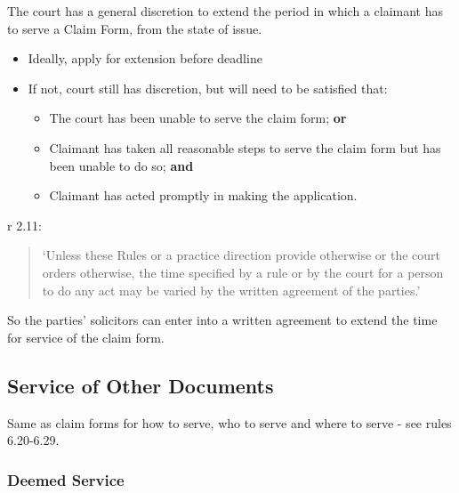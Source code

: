 \documentclass[
]{article}
\providecommand{\tightlist}{%
  \setlength{\itemsep}{0pt}\setlength{\parskip}{0pt}}
\begin{document}
The court has a general discretion to extend the period in which a
claimant has to serve a Claim Form, from the state of issue.

\begin{itemize}
\tightlist
\item
  Ideally, apply for extension before deadline
\item
  If not, court still has discretion, but will need to be satisfied
  that:

  \begin{itemize}
  \tightlist
  \item
    The court has been unable to serve the claim form; \textbf{or}
  \item
    Claimant has taken all reasonable steps to serve the claim form but
    has been unable to do so; \textbf{and}
  \item
    Claimant has acted promptly in making the application.
  \end{itemize}
\end{itemize}

r 2.11:

\begin{quote}
`Unless these Rules or a practice direction provide otherwise or the
court orders otherwise, the time specified by a rule or by the court for
a person to do any act may be varied by the written agreement of the
parties.'
\end{quote}

So the parties' solicitors can enter into a written agreement to extend
the time for service of the claim form.

\hypertarget{service-of-other-documents}{%
\subsection{Service of Other
Documents}\label{service-of-other-documents}}

Same as claim forms for how to serve, who to serve and where to serve -
see rules 6.20-6.29.

\hypertarget{deemed-service-1}{%
\subsubsection{Deemed Service}\label{deemed-service-1}}
\end{document}
